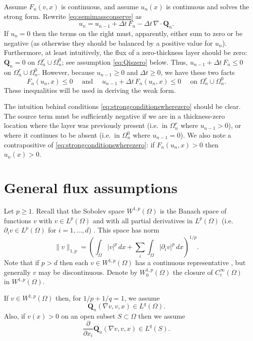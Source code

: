\documentclass[final,leqno,onefignum,onetabnum]{siamltex1213bueler}
\newcommand\bQ{\mathbf{Q}}
\newcommand{\Div}{\nabla\cdot}
\renewcommand{\grad}{\nabla}
\begin{document}
Assume $F_n(v,x)$ is continuous, and assume $u_n(x)$ is continuous and solves the strong form.  Rewrite \eqref{eq:semimassconserve} as
    $$u_n = u_{n-1} + \Delta t\, F_n - \Delta t\, \Div \bQ_n.$$
If $u_n=0$ then the terms on the right must, apparently, either sum to zero or be negative (as otherwise they should be balanced by a positive value for $u_n$).  Furthermore, at least intuitively, the flux of a zero-thickness layer should be zero: $\bQ_n=0$ on $\Omega_n^r \cup \Omega_n^0$; see assumption \eqref{eq:Qiszero} below.  Thus, $u_{n-1}+\Delta t\, F_n \le 0$ on $\Omega_n^r \cup \Omega_n^0$.  However, because $u_{n-1}\ge 0$ and $\Delta t\ge 0$, we have these two facts
\begin{equation}
F_n(u_n,x) \le 0 \quad \text{ and } \quad u_{n-1} + \Delta t\, F_n(u_n,x) \le 0 \quad \text{ on } \Omega_n^r \cup \Omega_n^0. \label{eq:strongconditionswherezero}
\end{equation}
These inequalities will be used in deriving the weak form.

The intuition behind conditions \eqref{eq:strongconditionswherezero} should be clear.  The source term must be sufficiently negative if we are in a thickness-zero location where the layer was previously present (i.e.~in $\Omega_n^r$ where $u_{n-1}>0$), or where it continues to be absent (i.e.~in $\Omega_n^0$ where $u_{n-1}=0$).  We also note a contrapositive of \eqref{eq:strongconditionswherezero}: if $F_n(u_n,x)>0$ then $u_n(x)>0$.


\section{General flux assumptions} \label{sec:fluxassumptions}

Let $p\ge 1$.  Recall that the Sobolev space $W^{1,p}(\Omega)$ is the Banach space of functions $v$ with $v\in L^p(\Omega)$ and with all partial derivatives in $L^p(\Omega)$ (i.e.~$\partial_i v \in L^p(\Omega)$ for $i=1,\dots,d$) \cite{Evans}.  This space has norm
    $$\|v\|_{1,p} = \left(\int_\Omega |v|^p\,dx + \sum_i \int_\Omega |\partial_i v|^p\,dx\right)^{1/p}.$$
Note that if $p>d$ then each $v\in W^{1,p}(\Omega)$ has a continuous representative \cite[``Morrey's inequality'']{Evans}, but generally $v$ may be discontinuous.  Denote by $W_0^{1,p}(\Omega)$ the closure of $C_c^\infty(\Omega)$ in $W^{1,p}(\Omega)$.

If $v \in W^{1,p}(\Omega)$ then, for $1/p + 1/q = 1$, we assume
\begin{equation}
\bQ_n(\grad v,v,x) \in L^q(\Omega). \label{eq:QisLq}
\end{equation}
Also, if $v(x)>0$ on an open subset $S\subset \Omega$ then we assume
\begin{equation}
\frac{\partial}{\partial x_i} \bQ_n(\grad v,v,x) \in L^q(S). \label{eq:Qissmooth}
\end{equation}
\end{document}
